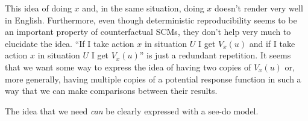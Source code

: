This idea of doing $x$ and, in the same situation, doing $x$ doesn't render very well in English. Furthermore, even though deterministic reproducibility seems to be an important property of counterfactual SCMs, they don't help very much to elucidate the idea. ``If I take action $x$ in situation $U$ I get $V_x(u)$ and if I take action $x$ in situation $U$ I get $V_x(u)$'' is just a redundant repetition. It seems that we want some way to express the idea of having two copies of $V_x(u)$ or, more generally, having multiple copies of a potential response function in such a way that we can make comparisons between their results.

The idea that we need \emph{can} be clearly expressed with a see-do model. 